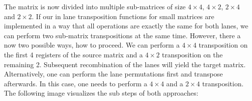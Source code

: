 \vspace{1cm}

The matrix is now divided into multiple sub-matrices of size $4\times 4$, $4\times 2$, $2\times 4$ and $2\times 2$.
If our in lane transposition functions for small matrices are implemented in a way that all operations are exactly the same for both lanes, we can perform two sub-matrix transpositions at the same time.
However, there a now two possible ways, how to proceed.
We can perform a $4 \times 4$ transposition on the first 4 registers of the source matrix and a $4 \times 2$ transposition on the remaining 2.
Subsequent recombination of the lanes will yield the target matrix.
Alternatively, one can perform the lane permutations first and transpose afterwards.
In this case, one needs to perform a $4 \times 4$ and a $2 \times 4$ transposition.
The following image visualizes the sub steps of both approaches:

